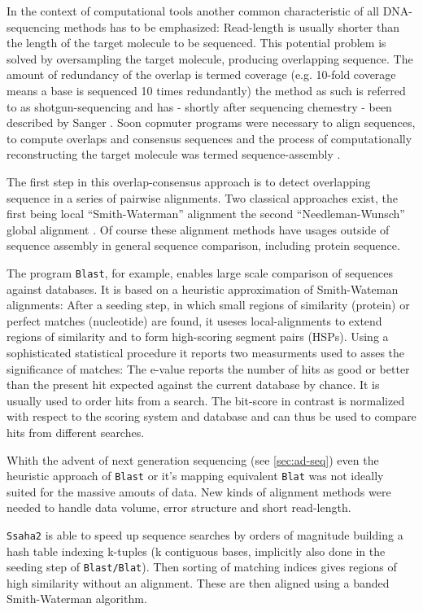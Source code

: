 In the context of computational tools another common characteristic of
all DNA-sequencing methods has to be emphasized: Read-length is
usually shorter than the length of the target molecule to be
sequenced. This potential problem is solved by oversampling the target
molecule, producing overlapping sequence. The amount of redundancy of
the overlap is termed coverage (e.g. 10-fold coverage means a base is
sequenced 10 times redundantly) the method as such is referred to as
shotgun-sequencing and has - shortly after sequencing chemestry - been
described by Sanger \cite{pmid6260957}. Soon copmuter programs were
necessary to align sequences, to compute overlaps and consensus
sequences \cite{pmid461197} and the process of computationally
reconstructing the target molecule was termed sequence-assembly
\cite{pmid6251542}.

The first step in this overlap-consensus approach is to detect
overlapping sequence in a series of pairwise alignments. Two classical
approaches exist, the first being local ``Smith-Waterman'' alignment
\cite{pmid7265238} the second ``Needleman-Wunsch'' global alignment
\cite{pmid7334527}. Of course these alignment methods have usages
outside of sequence assembly in general sequence comparison, including
protein sequence.

The program \texttt{Blast}, for example, enables large scale
comparison of sequences against databases. It is based on a heuristic
approximation of Smith-Wateman alignments: After a seeding step, in
which small regions of similarity (protein) or perfect matches
(nucleotide) are found, it useses local-alignments to extend regions
of similarity and to form high-scoring segment pairs (HSPs). Using a
sophisticated statistical procedure it reports two measurments used to
asses the significance of matches: The e-value reports the number of
hits as good or better than the present hit expected against the
current database by chance. It is usually used to order hits from a
search. The bit-score in contrast is normalized with respect to the
scoring system and database and can thus be used to compare hits from
different searches.

Whith the advent of next generation sequencing (see \ref{sec:ad-seq})
even the heuristic approach of \texttt{Blast} or it's mapping
equivalent \texttt{Blat} \cite{pmid11932250} was not ideally suited
for the massive amouts of data. New kinds of alignment methods were
needed to handle data volume, error structure and short read-length.

\texttt{Ssaha2} \cite{pmid11591649} is able to speed up sequence
searches by orders of magnitude building a hash table indexing
k-tuples (k contiguous bases, implicitly also done in the seeding step
of \texttt{Blast/Blat}). Then sorting of matching indices gives
regions of high similarity without an alignment. These are then
aligned using a banded Smith-Waterman algorithm.

